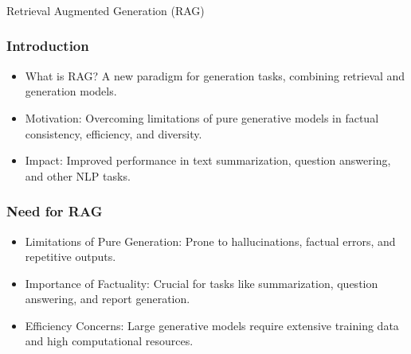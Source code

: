 \begin{frame}[fragile]\frametitle{}
\begin{center}
{\Large Retrieval Augmented Generation (RAG)}
\end{center}
\end{frame}

\begin{frame}[fragile]\frametitle{Introduction}

\begin{itemize}
\item What is RAG? A new paradigm for generation tasks, combining retrieval and generation models.
\item Motivation: Overcoming limitations of pure generative models in factual consistency, efficiency, and diversity.
\item Impact: Improved performance in text summarization, question answering, and other NLP tasks.
\end{itemize}	

\end{frame}


\begin{frame}[fragile]\frametitle{Need for RAG}

\begin{itemize}
\item Limitations of Pure Generation: Prone to hallucinations, factual errors, and repetitive outputs.
\item Importance of Factuality: Crucial for tasks like summarization, question answering, and report generation.
\item Efficiency Concerns: Large generative models require extensive training data and high computational resources.
\end{itemize}	

\end{frame}


